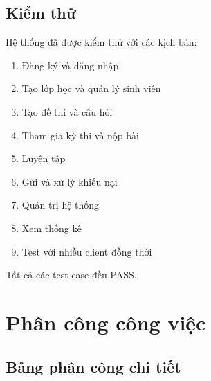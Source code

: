 ﻿\documentclass[12pt,a4paper]{report}
\begin{document}
\section{Kiểm thử}

Hệ thống đã được kiểm thử với các kịch bản:

\begin{enumerate}
    \item Đăng ký và đăng nhập
    \item Tạo lớp học và quản lý sinh viên
    \item Tạo đề thi và câu hỏi
    \item Tham gia kỳ thi và nộp bài
    \item Luyện tập
    \item Gửi và xử lý khiếu nại
    \item Quản trị hệ thống
    \item Xem thống kê
    \item Test với nhiều client đồng thời
\end{enumerate}

Tất cả các test case đều PASS.

\chapter{Phân công công việc}

\section{Bảng phân công chi tiết}
\end{document}

